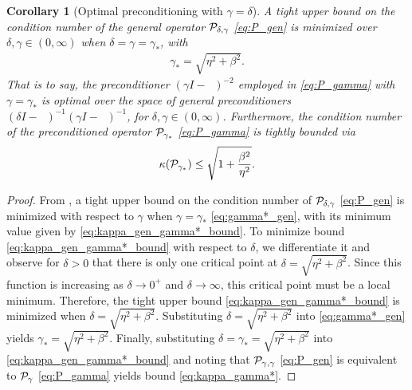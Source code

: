 \documentclass[a4paper,10pt]{article}
\newtheorem{corollary}{Corollary}
\DeclareMathOperator{\cL}{\widehat{\mathcal{L}}}
\begin{document}
\begin{corollary}[Optimal preconditioning with $\gamma = \delta$]
\label{cor:cond}
A tight upper bound on the condition number of the general operator ${\cal P}_{\delta,\gamma}$ \eqref{eq:P_gen} is minimized over $\delta, \gamma \in (0, \infty)$ when $\delta = \gamma = \gamma_*$, with
\begin{align} \label{eq:gamma*}
\gamma_* = \sqrt{\eta^2 + \beta^2}.
\end{align}
That is to say, the preconditioner $(\gamma I - \cL)^{-2}$ employed in \eqref{eq:P_gamma} with $\gamma = \gamma_*$ is optimal over the space of general preconditioners $(\delta I - \cL)^{-1}(\gamma I - \cL)^{-1}$, for $\delta, \gamma \in (0,\infty)$. Furthermore, the condition number of the preconditioned operator ${\cal P}_{\gamma_*}$ \eqref{eq:P_gamma} is tightly bounded via
\begin{align} \label{eq:kappa_gamma*}
\kappa({\cal P}_{\gamma_*}) \leq \sqrt{1 + \frac{\beta^2}{\eta^2}}.
\end{align}
\end{corollary}
\begin{proof}
From , a tight upper bound on the condition number of ${\cal P}_{\delta,\gamma}$ \eqref{eq:P_gen} is minimized with respect to $\gamma$ when $\gamma = \gamma_*$ \eqref{eq:gamma*_gen}, with its minimum value given by  \eqref{eq:kappa_gen_gamma*_bound}. To minimize bound \eqref{eq:kappa_gen_gamma*_bound} with respect to $\delta$, we differentiate it and observe for $\delta > 0$ that there is only one critical point at $\delta = \sqrt{\eta^2+ \beta^2}$. Since this function is increasing as $\delta \to 0^+$ and $\delta \to \infty$, this critical point must be a local minimum. Therefore, the tight upper bound \eqref{eq:kappa_gen_gamma*_bound} is minimized when $\delta = \sqrt{\eta^2+ \beta^2}$. Substituting $\delta =  \sqrt{\eta^2+ \beta^2}$ into \eqref{eq:gamma*_gen} yields $\gamma_* = \sqrt{\eta^2 + \beta^2}$. Finally, substituting $\delta = \gamma_* = \sqrt{\eta^2 + \beta^2}$ into \eqref{eq:kappa_gen_gamma*_bound} and noting that  ${\cal P}_{\gamma,\gamma}$ \eqref{eq:P_gen} is equivalent to ${\cal P}_{\gamma}$ \eqref{eq:P_gamma} yields bound \eqref{eq:kappa_gamma*}.
\end{proof}
\end{document}
